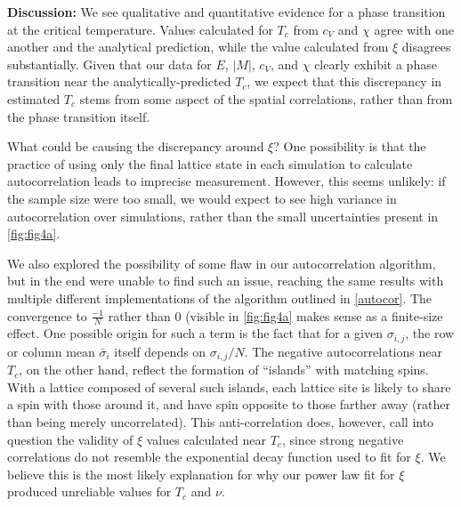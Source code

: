 \documentclass[letter,scriptaddress,twocolumn, prl,nofootinbib]{revtex4}
\begin{document}
\textbf{Discussion:} We see qualitative and quantitative evidence for a phase transition at the critical temperature. Values calculated for $T_c$ from $c_V$ and $\chi$ agree with one another and the analytical prediction, while the value calculated from $\xi$ disagrees substantially. Given that our data for $E$, $|M|$, $c_V$, and $\chi$ clearly exhibit a phase transition near the analytically-predicted $T_c$, we expect that this discrepancy in estimated $T_c$ stems from some aspect of the spatial correlations, rather than from the phase transition itself.

What could be causing the discrepancy around $\xi$? One possibility is that the practice of using only the final lattice state in each simulation to calculate autocorrelation leads to imprecise measurement. However, this seems unlikely: if the sample size were too small, we would expect to see high variance in autocorrelation over simulations, rather than the small uncertainties present in \autoref{fig:fig4a}.

We also explored the possibility of some flaw in our autocorrelation algorithm, but in the end were unable to find such an issue, reaching the same results with multiple different implementations of the algorithm outlined in \autoref{autocor}. The convergence to $\frac{-1}{N}$ rather than $0$ (visible in \autoref{fig:fig4a} makes sense as a finite-size effect. One possible origin for such a term is the fact that for a given $\sigma_{i, j}$, the row or column mean $\bar \sigma_i$ itself depends on $\sigma_{i, j}/N$. The negative autocorrelations near $T_c$, on the other hand, reflect the formation of ``islands'' with matching spins. With a lattice composed of several such islands, each lattice site is likely to share a spin with those around it, and have spin opposite to those farther away (rather than being merely uncorrelated). This anti-correlation does, however, call into question the validity of $\xi$ values calculated near $T_c$, since strong negative correlations do not resemble the exponential decay function used to fit for $\xi$. We believe this is the most likely explanation for why our power law fit for $\xi$ produced unreliable values for $T_c$ and $\nu$.
\end{document}
